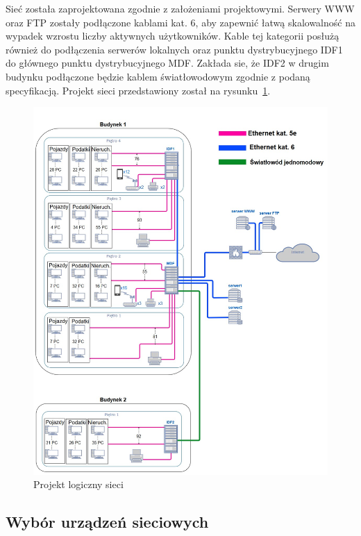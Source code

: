 \documentclass[12pt,a4paper]{article}
\begin{document}
	    Sieć została zaprojektowana zgodnie z założeniami projektowymi.
	    Serwery WWW oraz FTP zostały podłączone kablami kat. 6, aby zapewnić łatwą skalowalność na wypadek wzrostu liczby aktywnych użytkowników.
	    Kable tej kategorii posłużą również do podłączenia serwerów lokalnych oraz punktu dystrybucyjnego IDF1 do głównego punktu dystrybucyjnego MDF.
	    Zakłada sie, że IDF2 w drugim budynku podłączone będzie kablem światłowodowym zgodnie z podaną specyfikacją.
	    Projekt sieci przedstawiony został na rysunku~\ref{fig:projekt}.
	\begin{figure}[h]
	    \centering
	    \includegraphics[width = \textwidth]{obrazki/diagram.jpg}
	    \caption{Projekt logiczny sieci}
	    \label{fig:projekt}
	\end{figure}
	    
	\subsection{Wybór urządzeń sieciowych}
	    
	
\end{document}

